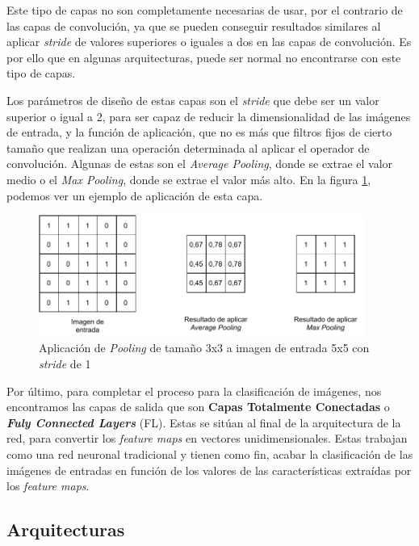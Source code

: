 Este tipo de capas no son completamente necesarias de usar, por el contrario de las capas de convolución, ya que se pueden conseguir resultados similares al aplicar \textit{stride} de valores superiores o iguales a dos en las capas de convolución. Es por ello que en algunas arquitecturas, puede ser normal no encontrarse con este tipo de capas.

Los parámetros de diseño de estas capas son el \textit{stride} que debe ser un valor superior o igual a 2, para ser capaz de reducir la dimensionalidad de las imágenes de entrada, y la función de aplicación, que no es más que filtros fijos de cierto tamaño que realizan una operación determinada al aplicar el operador de convolución. Algunas de estas son el \textit{Average Pooling}, donde se extrae el valor medio o el \textit{Max Pooling}, donde se extrae el valor más alto. En la figura \ref{fig:pooling}, podemos ver un ejemplo de aplicación de esta capa.\\

\begin{figure}[!h]
\centering
\includegraphics[width=0.95\textwidth]{figuras/desarrollo teorico/Pooling.pdf}
\caption{Aplicación de \textit{Pooling} de tamaño 3x3 a imagen de entrada 5x5 con \textit{stride} de 1}
\label{fig:pooling}
\end{figure}

Por último, para completar el proceso para la clasificación de imágenes, nos encontramos las capas de salida que son \textbf{Capas Totalmente Conectadas} o \textbf{\textit{Fuly Connected Layers}} (FL). Estas se sitúan al final de la arquitectura de la red, para convertir los \textit{feature maps} en vectores unidimensionales. Estas trabajan como una red neuronal tradicional y tienen como fin, acabar la clasificación de las imágenes de entradas en función de los valores de las características extraídas por los \textit{feature maps}.


\subsection{Arquitecturas}

